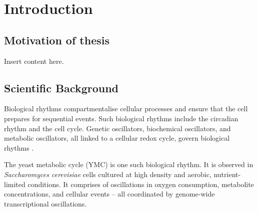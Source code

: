 
\chapter{Introduction}

\section{Motivation of thesis}

Insert content here.

\section{Scientific Background}
\label{sec:intro-bg}


Biological rhythms compartmentalise cellular processes and ensure that the cell prepares for sequential events.
Such biological rhythms include the circadian rhythm and the cell cycle.
Genetic oscillators, biochemical oscillators, and metabolic oscillators, all linked to a cellular redox cycle, govern biological rhythms \citep{mellorMolecularBasisMetabolic2016}.



The yeast metabolic cycle (YMC) is one such biological rhythm.
It is observed in \emph{Saccharomyces cerevisiae} cells cultured at high density and aerobic,
nutrient-limited conditions.
It comprises of oscillations in oxygen consumption, metabolite concentrations, and cellular events -- all coordinated by genome-wide transcriptional oscillations.

